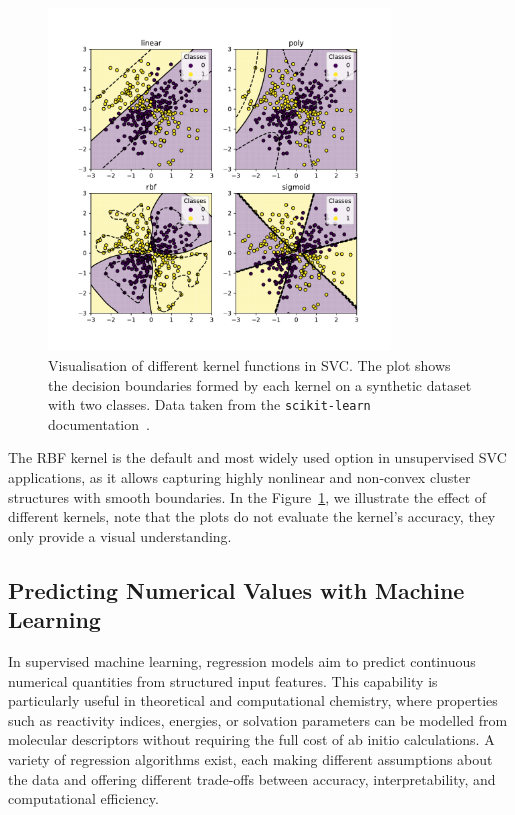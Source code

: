 \begin{figure}[H]
  \centering
  \includegraphics[width=0.81\textwidth]{img/kernels}
  \caption{Visualisation of different kernel functions in SVC. The plot shows
    the decision boundaries formed by each kernel on a synthetic dataset with
    two classes. Data taken from the \texttt{scikit-learn}
    documentation~\cite{scikit-svm-kernels}.}
  \label{plot_kernels}
\end{figure}

The RBF kernel is the default and most widely used option in unsupervised SVC
applications, as it allows capturing highly nonlinear and non-convex cluster
structures with smooth boundaries. In the Figure~\ref{plot_kernels}, we
illustrate the effect of different kernels, note that the plots do not evaluate
the kernel's accuracy, they only provide a visual understanding.

\subsection{Predicting Numerical Values with Machine Learning}

In supervised machine learning, regression models aim to predict continuous
numerical quantities from structured input features. This capability is
particularly useful in theoretical and computational chemistry, where properties
such as reactivity indices, energies, or solvation parameters can be modelled
from molecular descriptors without requiring the full cost of ab initio
calculations. A variety of regression algorithms exist, each making different
assumptions about the data and offering different trade-offs between accuracy,
interpretability, and computational efficiency.

